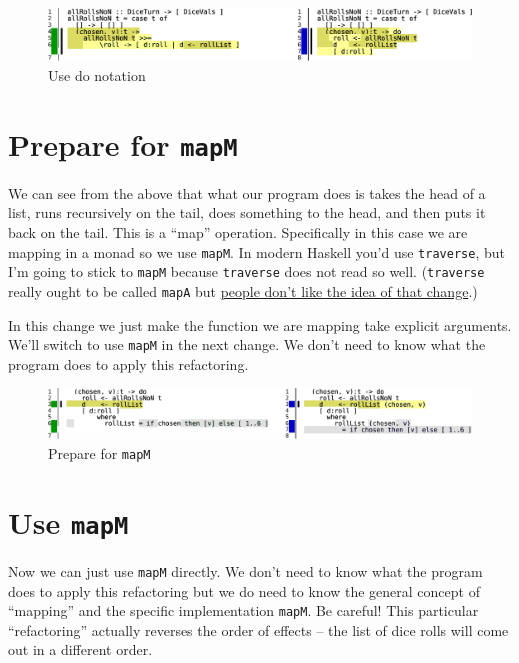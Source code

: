 \begin{figure}[htbp]
 \centering
 \includegraphics[width=\linewidth]{./pics/diff14.pdf}
 \caption{Use do notation}
 \label{fig:diff14}
\end{figure}


\section{Prepare for \texttt{mapM}}

We can see from the above that what our program does is takes the head of a list, runs recursively on the tail, does something to the head, and then puts it back on the tail. This is a ``map'' operation. Specifically in this case we are mapping in a monad so we use \texttt{mapM}. In modern Haskell you'd use \texttt{traverse}, but I'm going to stick to \texttt{mapM} because \texttt{traverse} does not read so well. (\texttt{traverse} really ought to be called \texttt{mapA} but \href{https://www.reddit.com/r/haskell/comments/68w09h/proposal_to_add_mapa_as_synonym_for_traverse/}{people don't like the idea of that change}.)

In this change we just make the function we are mapping take explicit arguments. We'll switch to use \texttt{mapM} in the next change. 
We don't need to know what the program does to apply this refactoring.

\begin{figure}[htbp]
 \centering
 \includegraphics[width=\linewidth]{./pics/diff15.pdf}
 \caption{Prepare for \texttt{mapM}}
 \label{fig:diff15}
\end{figure}


\section{Use \texttt{mapM}}

Now we can just use \texttt{mapM} directly. 
We don't need to know what the program does to apply this refactoring but we do need to know the general concept of ``mapping'' and the specific implementation \texttt{mapM}. Be careful! This particular ``refactoring'' actually reverses the order of effects -- the list of dice rolls will come out in a different order.

